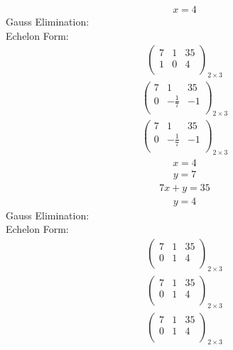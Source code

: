 \documentclass{article}
\begin{document}
\begin{align*}
x=4\end{align*}
Gauss Elimination:\\
Echelon Form:\\
\begin{align*}
\left(
\begin{array}{cc|c}
7 & 1 & 35\\
1 & 0 & 4\\
\end{array}
\right)_{2\times 3}
\end{align*}
\begin{align*}
\left(
\begin{array}{cc|c}
7 & 1 & 35\\
0 & -\frac{1}{7} & -1\\
\end{array}
\right)_{2\times 3}
\end{align*}
\begin{align*}
\left(
\begin{array}{cc|c}
7 & 1 & 35\\
0 & -\frac{1}{7} & -1\\
\end{array}
\right)_{2\times 3}
\end{align*}
\begin{align*}
x=4\end{align*}
\begin{align*}
y=7\end{align*}
\begin{align*}
7x + y=35\end{align*}
\begin{align*}
y=4\end{align*}
Gauss Elimination:\\
Echelon Form:\\
\begin{align*}
\left(
\begin{array}{cc|c}
7 & 1 & 35\\
0 & 1 & 4\\
\end{array}
\right)_{2\times 3}
\end{align*}
\begin{align*}
\left(
\begin{array}{cc|c}
7 & 1 & 35\\
0 & 1 & 4\\
\end{array}
\right)_{2\times 3}
\end{align*}
\begin{align*}
\left(
\begin{array}{cc|c}
7 & 1 & 35\\
0 & 1 & 4\\
\end{array}
\right)_{2\times 3}
\end{align*}
\end{document}
